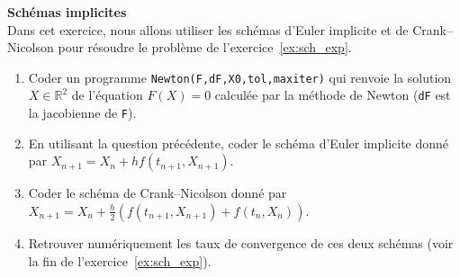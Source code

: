 \documentclass[12pt]{article}
\newcommand{\R}{\mathbb{R}}
\begin{document}
\newpage
\begin{exo}\textbf{Sch\'emas implicites}\\
  Dans cet exercice, nous allons utiliser les sch\'emas d'Euler implicite et de Crank--Nicolson
  pour r\'esoudre le probl\`eme de l'exercice~\ref{ex:sch_exp}.
\begin{enumerate}
\item Coder un programme \texttt{Newton(F,dF,X0,tol,maxiter)}
  qui renvoie la solution $X \in \R^2$ de l'\'equation $F(X) = 0$
  calcul\'ee par la m\'ethode de Newton (\texttt{dF} est la jacobienne de \texttt{F}).
\item En utilisant la question pr\'ec\'edente, coder le sch\'ema d'Euler implicite donn\'e par
  $X_{n+1} = X_n + h f(t_{n+1} , X_{n+1})$.
\item Coder le sch\'ema de Crank--Nicolson donn\'e par
  $X_{n+1} = X_n + \frac{h}2 (f(t_{n+1} , X_{n+1}) + f(t_{n} , X_{n}))$.
\item Retrouver num\'eriquement les taux de convergence de ces deux sch\'emas
  (voir la fin de l'exercice~\ref{ex:sch_exp}).
\end{enumerate}
\end{exo}
\end{document}
